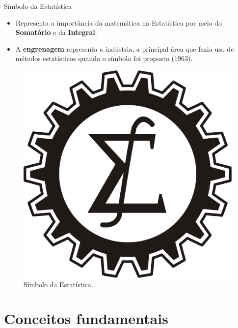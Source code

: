 \documentclass[
  ignorenonframetext,
  serif,
  professionalfont,
  usenames,
  dvipsnames,
  aspectratio = 169]{beamer}
\providecommand{\tightlist}{%
  \setlength{\itemsep}{0pt}\setlength{\parskip}{0pt}}
\renewcommand{\tightlist}{%
  \setlength{\itemsep}{0\baselineskip}
  \setlength{\parskip}{0.25\baselineskip}
}
\def\beginAHalfColumn{\begin{minipage}{0.49\textwidth}}%
\def\endColumns{\end{minipage}}%
\begin{document}
\begin{frame}{Símbolo da Estatística}
\label{suxedmbolo-da-estatuxedstica}
\beginAHalfColumn

\begin{itemize}
\tightlist
\item
  Representa a importância da matemática na Estatística por meio do
  \textbf{Somatório} e da \textbf{Integral}.
\end{itemize}

\vspace{0.3cm}

\begin{itemize}
\tightlist
\item
  A \textbf{engrenagem} representa a indústria, a principal área que
  fazia uso de métodos estatísticos quando o símbolo foi proposto
  (1963).
\end{itemize}

\endColumns
\beginAHalfColumn

\begin{figure}

{\centering \includegraphics[width=0.8\linewidth]{./img/simb_est} 

}

\caption{Símbolo da Estatística.}\label{fig:unnamed-chunk-2}
\end{figure}

\endColumns
\end{frame}

\section{Conceitos fundamentais}\label{conceitos-fundamentais}
\end{document}
